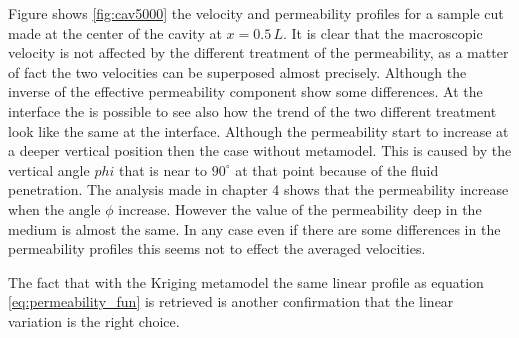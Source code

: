 Figure shows \ref{fig:cav5000} the velocity and permeability profiles for a sample cut made at the center of the cavity at $x=0.5\,L$.
It is clear that the macroscopic velocity is not affected by the different treatment of the permeability, as a matter of fact the two velocities can be superposed almost precisely.
Although the inverse of the effective permeability component show some differences. At the interface the is possible to see also how the trend of the two different treatment look like the same at the interface. Although the permeability start to increase at a deeper vertical position then the case without metamodel. This is caused by the vertical angle $phi$ that is near to $90^\circ$ at that point because of the fluid penetration. The analysis made in chapter 4 shows that the permeability increase when the angle $\phi$ increase.
However the value of the permeability deep in the medium is almost the same. 
In any case even if there are some differences in the permeability profiles this seems not to effect the averaged velocities.

The fact that with the Kriging metamodel the same linear profile as equation \ref{eq:permeability_fun} is retrieved is another confirmation that the linear variation is the right choice.


